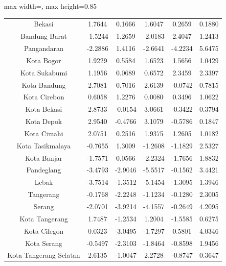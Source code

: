 \begin{table}[H]
\begin{adjustbox}{max width=\textwidth, max height=0.85\textheight}
\begin{tabular}{|c|c|c|c|c|c|}
Bekasi & 1.7644 & 0.1666 & 1.6047 & 0.2659 & 0.1880 \\
Bandung Barat & -1.5244 & 1.2659 & -2.0183 & 2.4047 & 1.2413 \\
Pangandaran & -2.2886 & 1.4116 & -2.6641 & -4.2234 & 5.6475 \\
Kota Bogor & 1.9229 & 0.5584 & 1.6523 & 1.5656 & 1.0429 \\
Kota Sukabumi & 1.1956 & 0.0689 & 0.6572 & 2.3459 & 2.3397 \\
Kota Bandung & 2.7081 & 0.7016 & 2.6139 & -0.0742 & 0.7815 \\
Kota Cirebon & 0.6058 & 1.2276 & 0.0080 & 0.3496 & 1.0622 \\
Kota Bekasi & 2.8733 & -0.0154 & 3.0661 & -0.3422 & 0.3794 \\
Kota Depok & 2.9540 & -0.4766 & 3.1079 & -0.5786 & 0.1847 \\
Kota Cimahi & 2.0751 & 0.2516 & 1.9375 & 1.2605 & 1.0182 \\
Kota Tasikmalaya & -0.7655 & 1.3009 & -1.2608 & -1.1829 & 2.5327 \\
Kota Banjar & -1.7571 & 0.0566 & -2.2324 & -1.7656 & 1.8832 \\
Pandeglang & -3.4793 & -2.9046 & -5.5517 & -0.1562 & 3.4421 \\
Lebak & -3.7514 & -1.3512 & -5.1454 & -1.3095 & 1.3946 \\
Tangerang & -0.1768 & -2.2248 & -1.1234 & -0.1280 & 2.3005 \\
Serang & -2.0701 & -3.9214 & -4.1557 & -0.2649 & 4.2095 \\
Kota Tangerang & 1.7487 & -1.2534 & 1.2004 & -1.5585 & 0.6275 \\
Kota Cilegon & 0.0323 & -3.0495 & -1.7297 & 0.5801 & 4.0346 \\
Kota Serang & -0.5497 & -2.3103 & -1.8464 & -0.8598 & 1.9456 \\
Kota Tangerang Selatan & 2.6135 & -1.0047 & 2.2728 & -0.8747 & 0.3647 \\
\hline
\end{tabular}
\end{adjustbox}
\end{table}